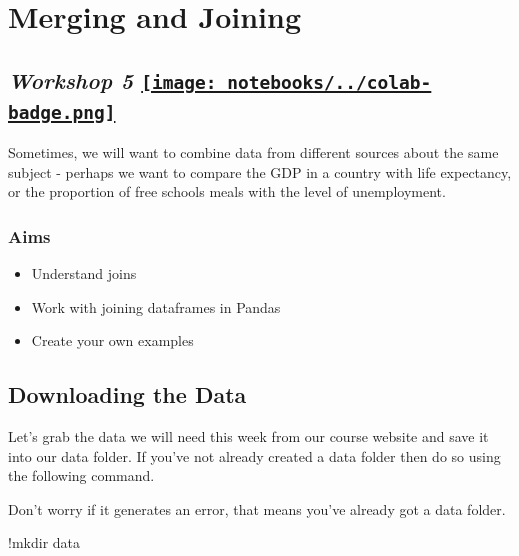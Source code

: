 \documentclass[
  letterpaper,
  DIV=11,
  numbers=noendperiod]{scrreprt}
\newenvironment{Shaded}{\begin{snugshade}}{\end{snugshade}}
\newcommand{\NormalTok}[1]{\textcolor[rgb]{0.00,0.23,0.31}{#1}}
\newcommand{\OperatorTok}[1]{\textcolor[rgb]{0.37,0.37,0.37}{#1}}
\providecommand{\tightlist}{%
  \setlength{\itemsep}{0pt}\setlength{\parskip}{0pt}}\usepackage{longtable,booktabs,array}
\begin{document}

\hypertarget{merging-and-joining}{%
\chapter{Merging and Joining}\label{merging-and-joining}}

\hypertarget{workshop-5-open-in-colab}{%
\section[\emph{Workshop 5} ]{\texorpdfstring{\emph{Workshop 5}
\href{https://colab.research.google.com/github/oballinger/QM2/blob/main/notebooks/W05.\%20Merging\%20and\%20Joining.ipynb}{\protect\texttt{[image: notebooks/../colab-badge.png]}}}{Workshop 5 Open In Colab}}\label{workshop-5-open-in-colab}}

Sometimes, we will want to combine data from different sources about the
same subject - perhaps we want to compare the GDP in a country with life
expectancy, or the proportion of free schools meals with the level of
unemployment.

\hypertarget{aims-2}{%
\subsection{Aims}\label{aims-2}}

\begin{itemize}
\tightlist
\item
  Understand joins
\item
  Work with joining dataframes in Pandas
\item
  Create your own examples
\end{itemize}

\hypertarget{downloading-the-data-2}{%
\section{Downloading the Data}\label{downloading-the-data-2}}

Let's grab the data we will need this week from our course website and
save it into our data folder. If you've not already created a data
folder then do so using the following command.

Don't worry if it generates an error, that means you've already got a
data folder.

\begin{Shaded}
\begin{Highlighting}[]
\OperatorTok{!}\NormalTok{mkdir data}
\end{Highlighting}
\end{Shaded}
\end{document}
